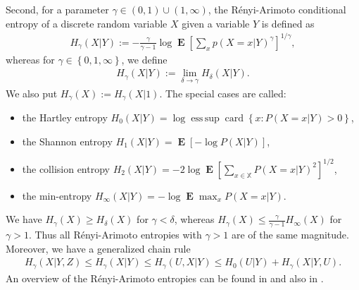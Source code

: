 \documentclass[a4paper]{article}
\newcommand{\kwad}[1]{\left[ #1 \right]}
\newcommand{\klam}[1]{\left\{ #1 \right\}}
\DeclareMathOperator{\esssup}{ess\, sup}
\DeclareMathOperator{\card}{card}
\DeclareMathOperator{\mean}{\mathbf{E}}
\begin{document}
Second, for a parameter $\gamma\in(0,1)\cup(1,\infty)$, the
R\'enyi-Arimoto conditional entropy of a discrete random variable $X$
given a variable $Y$ is defined as
\begin{align}
  \label{RenyiArimoto}
  H_\gamma(X|Y):=
  -\frac{\gamma}{\gamma-1}\log
  \mean\kwad{\sum_x p(X=x|Y)^{\gamma}}^{1/\gamma}
  ,
\end{align}
whereas for $\gamma\in\klam{0,1,\infty}$, we define
\begin{align}
  H_\gamma(X|Y):=\lim_{\delta\rightarrow\gamma} H_\delta(X|Y).
\end{align}
We also put $H_\gamma(X):=H_\gamma(X|1)$. The special cases are
called:
\begin{itemize}
\item the Hartley entropy
$H_0(X|Y)= \log \esssup\card\klam{x: P(X=x|Y)>0}$,
\item  the Shannon
entropy $H_1(X|Y)=\mean\kwad{-\log P(X|Y)}$, 
\item the collision entropy
$H_2(X|Y)=-2\log \mean\kwad{\sum_{x\in\mathbb{X}} P(X=x|Y)^2}^{1/2}$,
\item the min-entropy $H_\infty(X|Y)=-\log \mean\max_{x} P(X=x|Y)$.
\end{itemize}
We have $H_\gamma(X)\ge H_\delta(X)$ for $\gamma<\delta$, whereas
$H_\gamma(X)\le \frac{\gamma}{\gamma-1}H_\infty(X)$ for $\gamma>1$.
Thus all R\'enyi-Arimoto entropies with $\gamma>1$ are of the same
magnitude.  Moreover, we have a generalized chain rule
\begin{align}
  \label{Chain}
  H_\gamma(X|Y,Z)\le H_\gamma(X|Y)\le H_\gamma(U,X|Y)\le
  H_0(U|Y)+H_\gamma(X|Y,U).
\end{align}
An overview of the R\'enyi-Arimoto entropies can be found in
\citep{FehrBerens14} and also in \citep[Section 9.1]{Debowski21}.
\end{document}
